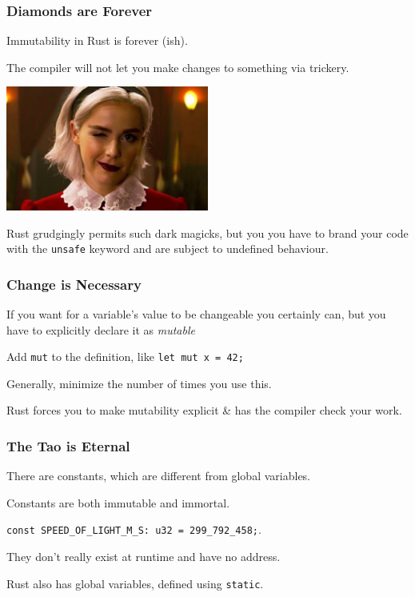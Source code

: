\begin{frame}
\frametitle{Diamonds are Forever}

Immutability in Rust is forever (ish).

The compiler will not let you make changes to something via trickery.

\begin{center}
	\includegraphics[width=0.5\textwidth]{images/sabrina.jpeg}
\end{center}


Rust grudgingly permits such dark magicks, but you you have to brand your code with the \texttt{unsafe} keyword and are subject to undefined behaviour.

\end{frame}


\begin{frame}
\frametitle{Change is Necessary}

If you want for a variable's value to be changeable you certainly can, but you have to explicitly declare it as \textit{mutable}

Add \texttt{mut} to the definition, like \texttt{let mut x = 42;}

Generally, minimize the number of times you use this.

Rust forces you to make mutability explicit \& has the compiler check your work.

\end{frame}


\begin{frame}
\frametitle{The Tao is Eternal}

There are constants, which are different from global variables. 

Constants are both immutable and immortal.

\texttt{const SPEED\_OF\_LIGHT\_M\_S: u32 = 299\_792\_458;}.

They don't really exist at runtime and have no address.

Rust also has global variables, defined using \texttt{static}.

\end{frame}



